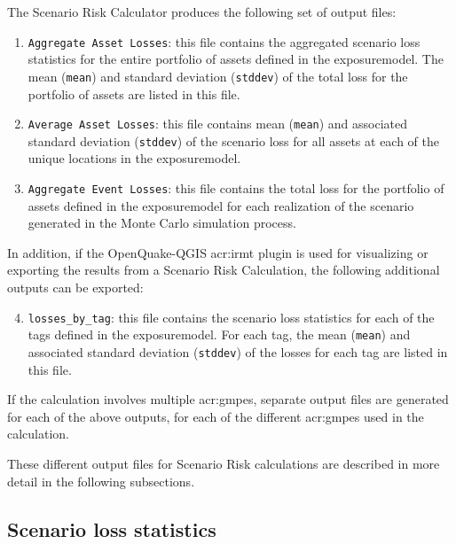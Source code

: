 The Scenario Risk Calculator produces the following set of output files:

\begin{enumerate}

  \item \Verb+Aggregate Asset Losses+: this file contains the aggregated scenario
    loss statistics for the entire portfolio of \glspl{asset} defined
    in the \gls{exposuremodel}. The mean (\Verb+mean+) and standard
    deviation (\Verb+stddev+) of the total loss for the portfolio of
    \glspl{asset} are listed in this file.

  \item \Verb+Average Asset Losses+: this file contains mean (\Verb+mean+) and
    associated standard deviation (\Verb+stddev+) of the scenario loss for all
    \glspl{asset} at each of the unique locations in the \gls{exposuremodel}.

  \item \Verb+Aggregate Event Losses+: this file contains the total loss for the
    portfolio of \glspl{asset} defined in the \gls{exposuremodel} for each
    realization of the scenario generated in the Monte Carlo simulation process.

\end{enumerate}

In addition, if the OpenQuake-QGIS \gls{acr:irmt} plugin is used for
visualizing or exporting the results from a Scenario Risk Calculation, the
following additional outputs can be exported:

\begin{enumerate}
\setcounter{enumi}{3}

  \item \Verb+losses_by_tag+: this file contains the scenario
    loss statistics for each of the \glspl{tag} defined in the
    \gls{exposuremodel}. For each \gls{tag}, the mean (\Verb+mean+)
    and associated standard deviation (\Verb+stddev+)
    of the losses for each tag are listed in this file.

\end{enumerate}

If the calculation involves multiple \glspl{acr:gmpe}, separate output files
are generated for each of the above outputs, for each of the different
\glspl{acr:gmpe} used in the calculation.

These different output files for Scenario Risk calculations are described in
more detail in the following subsections.


\subsection{Scenario loss statistics}
\label{subsec:scenario_loss_statistics}

